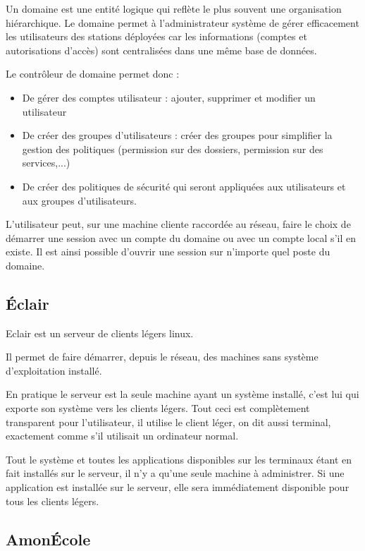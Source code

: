 Un domaine est une entité logique qui reflète le plus souvent une 
organisation hiérarchique. Le domaine permet à l'administrateur système de 
gérer efficacement les utilisateurs des stations déployées car les 
informations (comptes et autorisations d'accès) sont centralisées dans une 
même base de données.

Le contrôleur de domaine permet donc :

\begin{itemize}
  \item De gérer des comptes utilisateur : ajouter, supprimer et modifier 
        un utilisateur
  \item De créer des groupes d'utilisateurs : créer des groupes pour 
        simplifier la gestion des politiques (permission sur des dossiers, 
        permission sur des services,...)
  \item De créer des politiques de sécurité qui seront appliquées aux 
        utilisateurs et aux groupes d'utilisateurs.
\end{itemize}            
 
L'utilisateur peut, sur une machine cliente raccordée au réseau, faire le 
choix de démarrer une session avec un compte du domaine ou avec un compte 
local s'il en existe. Il est ainsi possible d'ouvrir une session sur 
n'importe quel poste du domaine.

\subsection{Éclair}

Eclair est un serveur de clients légers linux.

Il permet de faire démarrer, depuis le réseau, des machines sans système
d'exploitation installé.

En pratique le serveur est la seule machine ayant un système installé, c'est 
lui qui exporte son système vers les clients légers. Tout ceci est 
complètement transparent pour l'utilisateur, il utilise le client léger, on 
dit aussi terminal, exactement comme s'il utilisait un ordinateur normal.

Tout le système et toutes les applications disponibles sur les terminaux étant
en fait installés sur le serveur, il n'y a qu'une seule machine à administrer.
Si une application est installée sur le serveur, elle sera
immédiatement disponible pour tous les clients légers.

\subsection{AmonÉcole}

